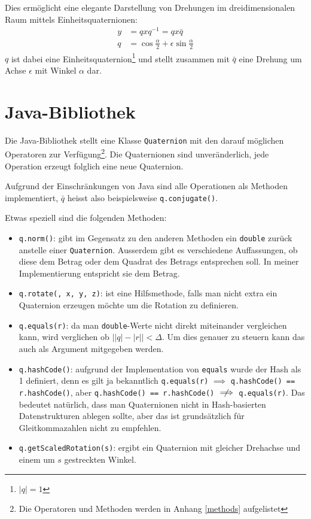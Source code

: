 \documentclass[12pt]{article}
\begin{document}
  Dies ermöglicht eine  elegante Darstellung von Drehungen im dreidimensionalen Raum mittels Einheitsquaternionen:
  \begin{align*}
    y &= q x q^{-1} = q x \bar{q} \\
	q &= \cos{\frac{\alpha}{2}} + \epsilon \sin{\frac{\alpha}{2}}
  \end{align*}
  $q$ ist dabei eine Einheitsquaternion\footnote{$\lvert q \rvert = 1$} und stellt zusammen mit $\bar{q}$ eine Drehung um Achse $\epsilon$ mit Winkel $\alpha$ dar.


  \section{Java-Bibliothek}

  Die Java-Bibliothek stellt eine Klasse \texttt{Quaternion} mit den darauf möglichen Operatoren zur Verfügung\footnote{Die Operatoren und Methoden werden in Anhang \ref{methods} aufgelistet}. Die Quaternionen sind unveränderlich, jede Operation erzeugt folglich eine neue Quaternion.

  Aufgrund der Einschränkungen von Java sind alle Operationen als Methoden implementiert, $\bar{q}$ heisst also beispielsweise \texttt{q.conjugate()}.

  Etwas speziell sind die folgenden Methoden:
  \begin{itemize}
    \item \texttt{q.norm()}: gibt im Gegensatz zu den anderen Methoden ein \texttt{double} zurück anstelle einer \texttt{Quaternion}. Ausserdem gibt es verschiedene Auffassungen, ob diese dem Betrag oder dem Quadrat des Betrags entsprechen soll. In meiner Implementierung entspricht sie dem Betrag.
    \item \texttt{q.rotate(\texttheta, x, y, z)}: ist eine Hilfsmethode, falls man nicht extra ein Quaternion erzeugen möchte um die Rotation zu definieren.
    \item \texttt{q.equals(r)}: da man \texttt{double}-Werte nicht direkt miteinander vergleichen kann, wird verglichen ob $\lvert \lvert q \rvert - \lvert r \rvert \rvert < \Delta$. Um dies genauer zu steuern kann das \textDelta{} auch als Argument mitgegeben werden.
    \item \texttt{q.hashCode()}: aufgrund der Implementation von \texttt{equals} wurde der Hash als 1 definiert, denn es gilt ja bekanntlich \texttt{q.equals(r)} $\implies$ \texttt{q.hashCode() == r.hashCode()}, aber \texttt{q.hashCode() == r.hashCode()} $\centernot\implies$ \texttt{q.equals(r)}. Das bedeutet natürlich, dass man Quaternionen nicht in Hash-basierten Datenstrukturen ablegen sollte, aber das ist grundsätzlich für Gleitkommazahlen nicht zu empfehlen.
    \item \texttt{q.getScaledRotation(s)}: ergibt ein Quaternion mit gleicher Drehachse und einem um $s$ gestreckten Winkel.
  \end{itemize}
\end{document}
